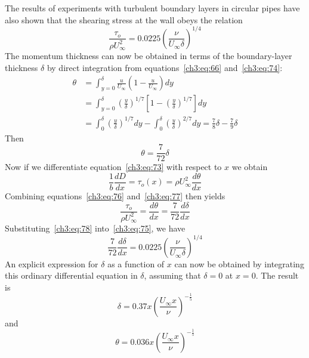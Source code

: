 The results of experiments with turbulent boundary layers
in circular pipes have also shown that the shearing stress at
the wall obeys the relation
\begin{equation}\label{ch3:eq:75}
\frac{\tau_o}{\rho U_\infty^{2}} = 0.0225\left(\frac{\nu}{U_\infty\delta}\right)^{1/4}
\end{equation}
The momentum thickness can now be obtained in terms of the
boundary-layer thickness $\delta$ by direct integration from
equations~\eqref{ch3:eq:66} and~\eqref{ch3:eq:74}:
\begin{align*}
\theta &= \int_{y=0}^{\delta} \frac{u}{U_\infty}\left(1 - \frac{u}{U_\infty}\right)dy\\
&= \int_{y=0}^{\delta} \left(\frac{y}{\delta}\right)^{1/7}\left[1 - \left(\frac{y}{\delta}\right)^{1/7}\right]dy\\
&= \int_{0}^{\delta} \left(\frac{y}{\delta}\right)^{1/7}dy
  - \int_{0}^{\delta} \left(\frac{y}{\delta}\right)^{2/7}dy
  = \frac{7}{8}\delta - \frac{7}{9}\delta
\end{align*}
Then
\begin{equation}\label{ch3:eq:76}
\theta = \frac{7}{72}\delta
\end{equation}
Now if we differentiate equation~\eqref{ch3:eq:73} with respect to $x$ we
obtain
\begin{equation}\label{ch3:eq:77}
\frac{1}{b}\frac{dD}{dx} = \tau_o(x) = \rho U_\infty^{2}\frac{d\theta}{dx}
\end{equation}
Combining equations~\eqref{ch3:eq:76} and~\eqref{ch3:eq:77} then yields
\begin{equation}\label{ch3:eq:78}
\frac{\tau_o}{\rho U_\infty^{2}} = \frac{d\theta}{dx} = \frac{7}{72}\frac{d\delta}{dx}
\end{equation}
Substituting~\eqref{ch3:eq:78} into~\eqref{ch3:eq:75}, we have
\begin{equation}\label{ch3:eq:79}
\frac{7}{72}\frac{d\delta}{dx} = 0.0225\left(\frac{\nu}{U_\infty\delta}\right)^{1/4}
\end{equation}
An explicit expression for $\delta$ as a function of $x$ can now be
obtained by integrating this ordinary differential equation
in $\delta$, assuming that $\delta = 0$ at $x = 0$. The result is
\begin{equation}\label{ch3:eq:80}
\delta = 0.37x\left(\frac{U_\infty x}{\nu}\right)^{-\frac{1}{5}}
\end{equation}
and
\begin{equation}\label{ch3:eq:81}
\theta = 0.036x\left(\frac{U_\infty x}{\nu}\right)^{-\frac{1}{5}}
\end{equation}

